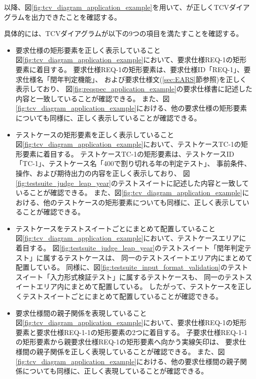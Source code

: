 以降、図\ref{fig:tcv_diagram_application_example}を用いて、\tool{}が正しくTCVダイアグラムを出力できたことを確認する。                                      

具体的には、TCVダイアグラムが以下の9つの項目を満たすことを確認する。

\begin{itemize}
    \item 要求仕様の矩形要素を正しく表示していること\\
    図\ref{fig:tcv_diagram_application_example}において、要求仕様REQ-1の矩形要素に着目する。
    要求仕様REQ-1の矩形要素は、要求仕様ID「REQ-1」、要求仕様名「閏年判定機能」、
    および要求仕様文(\ref{sec:EARS}節参照)を正しく表示しており、
    図\ref{fig:reqspec_application_example}の要求仕様書に記述した内容と一致していることが確認できる。
    また、図\ref{fig:tcv_diagram_application_example}における、他の要求仕様の矩形要素についても同様に、正しく表示していることが確認できる。

    \item テストケースの矩形要素を正しく表示していること\\
    図\ref{fig:tcv_diagram_application_example}において、テストケースTC-1の矩形要素に着目する。
    テストケースTC-1の矩形要素は、テストケースID「TC-1」、テストケース名「400で割り切れる年の判定テスト」、
    事前条件、操作、および期待出力の内容を正しく表示しており、
    図\ref{fig:testsuite_judge_leap_year}のテストスイートに記述した内容と一致していることが確認できる。
    また、図\ref{fig:tcv_diagram_application_example}における、他のテストケースの矩形要素についても同様に、正しく表示していることが確認できる。

    \item テストケースをテストスイートごとにまとめて配置していること\\
    図\ref{fig:tcv_diagram_application_example}において、テストケースエリアに着目する。
    図\ref{fig:testsuite_judge_leap_year}のテストスイート「閏年判定テスト」に属するテストケースは、
    同一のテストスイートエリア内にまとめて配置している。
    同様に、図\ref{fig:testsuite_input_format_validation}のテストスイート「入力形式検証テスト」に属するテストケースも、
    同一のテストスイートエリア内にまとめて配置している。
    したがって、テストケースを正しくテストスイートごとにまとめて配置していることが確認できる。

    \item 要求仕様間の親子関係を表現していること\\                                                                                             
    図\ref{fig:tcv_diagram_application_example}において、要求仕様REQ-1の矩形要素と要求仕様REQ-1-1の矩形要素の2つに着目する。
    子要求仕様REQ-1-1の矩形要素から親要求仕様REQ-1の矩形要素へ向かう実線矢印は、                                                       
    要求仕様間の親子関係を正しく表現していることが確認できる。
    また、図\ref{fig:tcv_diagram_application_example}における、他の要求仕様間の親子関係についても同様に、正しく表現していることが確認できる。


\end{itemize}
